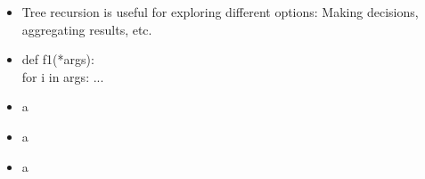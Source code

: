 \documentclass{article}
\begin{document}
\begin{itemize}
	\item Tree recursion is useful for exploring different options: Making decisions, aggregating results, etc.
	\item def f1(*args): \\
	for i in args: ...
\end{itemize}

\begin{itemize}
	\item a

\end{itemize}

\begin{itemize}
	\item a
\end{itemize}

\begin{itemize}
	\item a
\end{itemize}
\end{document}

